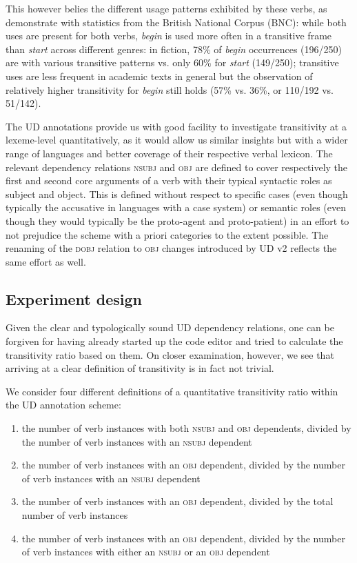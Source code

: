 This however belies the different usage patterns exhibited by these verbs, as \citet[95]{biber1998} demonstrate with statistics from the British National Corpus (BNC): while both uses are present for both verbs, \textit{begin} is used more often in a transitive frame than \textit{start} across different genres: in fiction, 78\% of \textit{begin} occurrences (196/250) are with various transitive patterns vs. only 60\% for \textit{start} (149/250); transitive uses are less frequent in academic texts in general but the observation of relatively higher transitivity for \textit{begin} still holds (57\% vs. 36\%, or 110/192 vs. 51/142).

The UD annotations provide us with good facility to investigate transitivity at a lexeme-level quantitatively, as it would allow us similar insights but with a wider range of languages and better coverage of their respective verbal lexicon. The relevant dependency relations \textsc{nsubj} and \textsc{obj} are defined to cover respectively the first and second core arguments of a verb with their typical syntactic roles as subject and object. This is defined without respect to specific cases (even though typically the accusative in languages with a case system) or semantic roles (even though they would typically be the proto-agent and proto-patient) in an effort to not prejudice the scheme with a priori categories to the extent possible. The renaming of the \textsc{dobj} relation to \textsc{obj} changes introduced by UD v2 \citep{nivre2020} reflects the same effort as well.

\subsection{Experiment design}

Given the clear and typologically sound UD dependency relations, one can be forgiven for having already started up the code editor and tried to calculate the transitivity ratio based on them. On closer examination, however, we see that arriving at a clear definition of transitivity is in fact not trivial.

We consider four different definitions of a quantitative transitivity ratio within the UD annotation scheme:

\begin{enumerate}
    \item the number of verb instances with both \textsc{nsubj} and \textsc{obj} dependents, divided by the number of verb instances with an \textsc{nsubj} dependent
    \item the number of verb instances with an \textsc{obj} dependent, divided by the number of verb instances with an \textsc{nsubj} dependent
    \item the number of verb instances with an \textsc{obj} dependent, divided by the total number of verb instances
    \item the number of verb instances with an \textsc{obj} dependent, divided by the number of verb instances with either an \textsc{nsubj} or an \textsc{obj} dependent
\end{enumerate}

